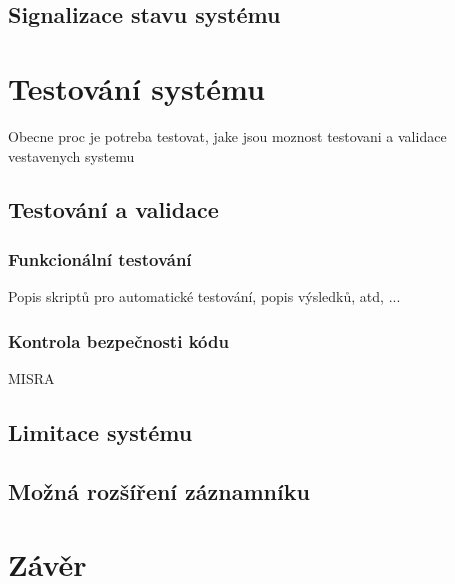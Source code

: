 \section{Signalizace stavu systému}

\chapter{Testování systému}
Obecne proc je potreba testovat, jake jsou moznost testovani a validace vestavenych systemu


\section{Testování a validace}

\subsection{Funkcionální testování}
Popis skriptů pro automatické testování, popis výsledků, atd, ...

\subsection{Kontrola bezpečnosti kódu}
MISRA


\section{Limitace systému}
\label{limitace}


\section{Možná rozšíření záznamníku}
\label{mozne_rozsireni}

\chapter{Závěr}
\label{zaverPrace}



%
